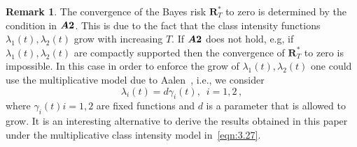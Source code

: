 \documentclass[lettersize,journal,onecolumn]{IEEEtran}
\theoremstyle{definition}
\newtheorem{remark}{Remark}
\newcommand{\assumption}[1]{{\rm \boldsymbol{A#1}}}
\begin{document}
\begin{remark}
	\label{remark:4}
	The convergence of the Bayes risk $\mathbf{R}_{T}^{*}$ to zero is determined by 
	the condition in $\assumption{2}$. This is due to the fact that the class 
	intensity functions $\lambda_{1}(t),\lambda_{2}(t)$ grow with increasing $T$. If 
	$\assumption{2}$ does not hold, e.g, if $\lambda_{1}(t),\lambda_{2}(t)$ are 
	compactly supported then the convergence of $\mathbf{R}_{T}^{*}$ to zero is 
	impossible. In this case in order to enforce the grow of 
	$\lambda_{1}(t),\lambda_{2}(t)$ one could use the multiplicative model due to 
	Aalen~\cite{aalen1978nonparametric}, i.e., we consider
	\begin{equation}
		\lambda_{i}(t)=d\gamma_{i}(t),
		\enspace
		i=1,2
		\label{eqn:3.27}\,,		
	\end{equation}
	where $\gamma_{i}(t)$\enspace$i=1,2$ are fixed functions and $d$ is a parameter 
	that is allowed to grow. It is an interesting alternative 
	to derive the results obtained in this paper under the multiplicative class 
	intensity model in~\eqref{eqn:3.27}.
\end{remark}
\end{document}

